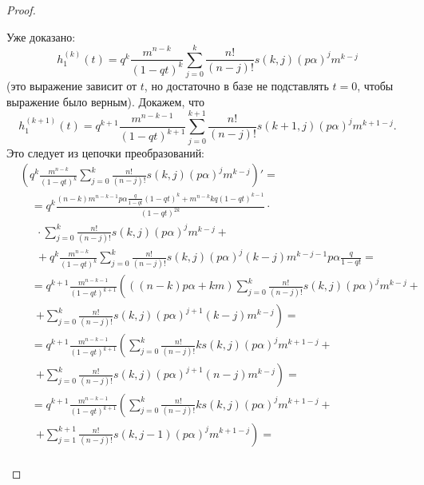 \documentclass[12pt, specialist, subf, substylefile = spbu_report.rtx]{disser}
\begin{document}
\begin{proof}
\begin{enumerate}
			Уже доказано:
			\[
				h _1 ^{(k)} (t) = q ^k \frac {m ^{n - k}} {(1 - qt) ^k} \sum \limits ^k _{j = 0} \frac {n !} {(n - j)!} s(k, j) (p \alpha) ^j m ^{k - j}
			\]
			(это выражение зависит от $t$, но достаточно в базе не подставлять $t = 0$, чтобы выражение было верным). Докажем, что
			\[
				h _1 ^{(k + 1)} (t) = q ^{k + 1} \frac {m ^{n - k - 1}} {(1 - qt) ^{k + 1}} \sum \limits ^{k + 1} _{j = 0} \frac {n !} {(n - j)!} s(k + 1, j) (p \alpha) ^j m ^{k + 1 - j}.
			\]
			Это следует из цепочки преобразований:
			\[
				\begin{aligned}
					&\left(q ^k \frac {m ^{n - k}} {(1 - qt) ^k} \sum \limits ^k _{j = 0} \frac {n !} {(n - j)!} s(k, j) (p \alpha) ^j m ^{k - j}\right)' =\\
					&\quad= q ^k \frac	{(n - k)m ^{n - k - 1} p \alpha \frac{q}{1 - qt} (1 - qt) ^k + m ^{n - k} kq (1 - qt) ^{k - 1}} {(1 - qt) ^{2k}} \cdot\\
					&\quad~~\cdot \sum \limits ^k _{j = 0} \frac {n !} {(n - j)!} s(k, j) (p \alpha) ^j m ^{k - j} +\\
					&\quad~~ + q ^k \frac {m ^{n - k}} {(1 - qt) ^k} \sum \limits ^k _{j = 0} \frac {n !} {(n - j)!} s(k, j) (p \alpha) ^j (k - j)m ^{k - j - 1} p \alpha \frac{q}{1 - qt} =\\
					&\quad= q ^{k + 1} \frac {m ^{n - k - 1}} {(1 - qt) ^{k + 1}} \left(\left((n - k) p \alpha + km\right) \sum \limits ^k _{j = 0} \frac {n !} {(n - j)!} s(k, j) (p \alpha) ^j m ^{k - j} +\right.\\
					&\quad~~ \left.+ \sum \limits ^k _{j = 0} \frac {n !} {(n - j)!} s(k, j) (p \alpha) ^{j + 1} (k - j)m ^{k - j} \right)=\\
					&\quad= q ^{k + 1} \frac {m ^{n - k - 1}} {(1 - qt) ^{k + 1}} \left(\sum \limits ^k _{j = 0} \frac {n !} {(n - j)!} k s(k, j) (p \alpha) ^j m ^{k + 1 - j} +\right.\\
					&\quad~~\left.+ \sum \limits ^k _{j = 0} \frac {n !} {(n - j)!} s(k, j) (p \alpha) ^{j + 1} (n - j)m ^{k - j} \right)=\\
					&\quad= q ^{k + 1} \frac {m ^{n - k - 1}} {(1 - qt) ^{k + 1}} \left(\sum \limits ^k _{j = 0} \frac {n !} {(n - j)!} k s(k, j) (p \alpha) ^j m ^{k + 1 - j} +\right.\\
					&\quad~~ \left.+ \sum \limits ^{k + 1} _{j = 1} \frac {n !} {(n - j)!} s(k, j - 1) (p \alpha) ^j m ^{k + 1 - j} \right)=\\

\end{aligned}\]
\end{enumerate}
\end{proof}
\end{document}
